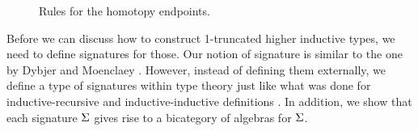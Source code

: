 \begin{figure*}
\vspace{5pt}

\begin{center}
\begin{bprooftree}
\end{bprooftree}
\end{center}

\vspace{5pt}

\begin{center}
\begin{bprooftree}
\end{bprooftree}
\begin{bprooftree}
\end{bprooftree}
\end{center}


\caption{Rules for the homotopy endpoints.}
\label{fig:homot_ep}
\end{figure*}

Before we can discuss how to construct 1-truncated higher inductive types,
we need to define signatures for those.
Our notion of signature is similar to the one by Dybjer and Moenclaey \cite{DBLP:journals/entcs/DybjerM18}.
However, instead of defining them externally, we define a type of signatures within type theory
just like what was done for inductive-recursive and inductive-inductive
definitions \cite{Dybjer1999AFA,forsberg2012finite}. 
In addition, we show that each signature $\sign$ gives rise to a bicategory of algebras for $\sign$.

